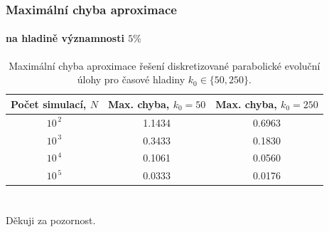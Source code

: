 \begin{frame}\frametitle{Maximální chyba aproximace}
\framesubtitle{na hladině významnosti $5 \%$}

\begin{table}[H]
\renewcommand*{\arraystretch}{1.5}
\centering
	\begin{tabular}{ |c||c|c| }
		\hline
		Počet simulací, $N$ & Max. chyba, $k_{0}=50$ & Max. chyba, $k_{0}=250$ \\ \hline\hline
		$10^{\,2}$ & 1.1434 & 0.6963 \\ \hline
		$10^{\,3}$ & 0.3433 & 0.1830 \\ \hline
		$10^{\,4}$ & 0.1061 & 0.0560 \\ \hline
		$10^{\,5}$ & 0.0333 & 0.0176 \\ \hline
	\end{tabular}
	\caption{Maximální chyba aproximace řešení diskretizované parabolické evoluční úlohy pro časové hladiny $k_{0}\in\{50,250\}$.}
	\label{tab:error}
\end{table}
\end{frame}

\section{}

\begin{frame}
	\centering
	\Huge Děkuji za pozornost.
\end{frame}

%
%		
%		


